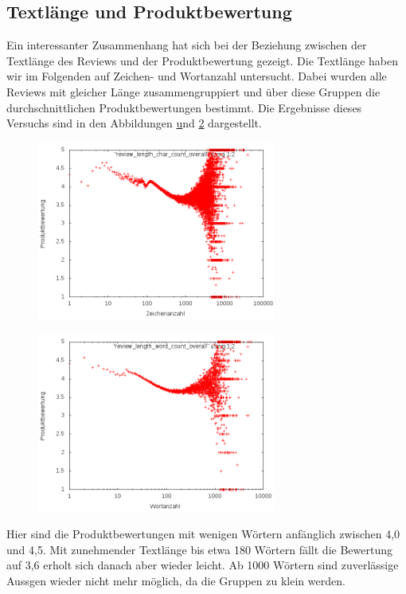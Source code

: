 \documentclass{scrartcl}
\theoremstyle{my_th_style}
\begin{document}
\subsection{Textlänge und Produktbewertung}
Ein interessanter Zusammenhang hat sich bei der Beziehung zwischen der Textlänge des Reviews und der Produktbewertung gezeigt. Die Textlänge haben wir im Folgenden auf Zeichen- und  Wortanzahl untersucht. Dabei wurden alle Reviews mit gleicher Länge zusammengruppiert und über diese Gruppen die durchschnittlichen Produktbewertungen bestimmt. Die Ergebnisse dieses Versuchs sind in den Abbildungen \href{fig_char_rating} und \ref{fig_word_rating} dargestellt.
\begin{figure}
\centering
    \includegraphics[width=0.7\textwidth]{_results/char_rating.png}
	\label{fig_char_rating}
\end{figure}
\begin{figure}
\centering
    \includegraphics[width=0.7\textwidth]{_results/word_rating.png}
	\label{fig_word_rating}
\end{figure}
Hier sind die Produktbewertungen mit wenigen Wörtern anfänglich zwischen 4,0 und 4,5. Mit zunehmender Textlänge bis etwa 180 Wörtern fällt die Bewertung auf 3,6 erholt sich danach aber wieder leicht. Ab 1000 Wörtern sind zuverlässige Aussgen wieder nicht mehr möglich, da die Gruppen zu klein werden.
\end{document}
